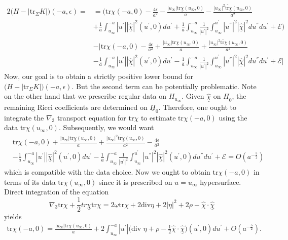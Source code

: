 \documentclass{amsart}
\newcommand{\Hbar}{\underline{H}}
\newcommand{\chihat}{\hat{\chi}}
\newcommand{\chibar}{\underline{\chi}}
\newcommand{\chibarhat}{\underline{\hat{\chi}}}
\renewcommand{\div}{\mbox{div }}
\newcommand{\tr}{\mbox{tr}}
\begin{document}
\begin{align}
2\bigg(H-|\tr_{\Sigma}K|\bigg)(-a,\epsilon)=&=\bigg(\tr\chi(-a,0)-\frac{4\epsilon}{a^{2}}-\frac{|u_{\infty}|\tr\chibar(u_{\infty},0)}{a}-\frac{|u_{\infty}|^{2}\widetilde{\tr\chibar}(u_{\infty},0)}{a^{2}}\\\nonumber
&+\frac{1}{a}\int_{u_{\infty}}^{-a}|u^{'}||\chibarhat|^{2}(u^{'},0)du^{'}+\frac{1}{a}\int_{u_{\infty}}^{-a}\frac{1}{|u^{'}|^{2}}\int_{u_{\infty}}^{u^{'}}|u^{''}|^{2}|\chibarhat|^{2}du^{''}du^{'}+\mathscr{E}\bigg)\\\nonumber
&-\bigg|\tr\chi(-a,0)-\frac{4\epsilon}{a^{2}}+\frac{|u_{\infty}|\tr\chibar(u_{\infty},0)}{a}+\frac{|u_{\infty}|^{2}\widetilde{\tr\chibar}(u_{\infty},0)}{a^{2}}\\\nonumber
&-\frac{1}{a}\int_{u_{\infty}}^{-a}|u^{'}||\chibarhat|^{2}(u^{'},0)du^{'}-\frac{1}{a}\int_{u_{\infty}}^{-a}\frac{1}{|u^{'}|^{2}}\int_{u_{\infty}}^{u^{'}}|u^{''}|^{2}|\chibarhat|^{2}du^{''}du^{'}+\mathscr{E}\bigg|
\end{align}
Now, our goal is to obtain a strictly positive lower bound for $\bigg(H-|\tr_{\Sigma}K|\bigg)(-a,\epsilon)$. But the second term can be potentially problematic. Note on the other hand that we prescribe regular data on $H_{u_{\infty}}$. Given $\chibarhat$ on $\Hbar_{0}$, the remaining Ricci coefficients are determined on $\Hbar_{0}$. Therefore, one ought to integrate the $\nabla_{3}$ transport equation for $\tr\chi$ to estimate $\tr\chi(-a,0)$ using the data $\tr\chi(u_{\infty},0)$.  
Subsequently, we would want 
\begin{align}
\label{eq:trchi}
&\tr\chi(-a,0)+\frac{|u_{\infty}|\tr\chibar(u_{\infty},0)}{a}+\frac{|u_{\infty}|^{2}\widetilde{\tr\chibar}(u_{\infty},0)}{a^{2}}-\frac{4\epsilon}{a^{2}}\\\nonumber
&-\frac{1}{a}\int_{u_{\infty}}^{-a}|u^{'}||\chibarhat|^{2}(u^{'},0)du^{'}-\frac{1}{a}\int_{u_{\infty}}^{-a}\frac{1}{|u^{'}|^{2}}\int_{u_{\infty}}^{u^{'}}|u^{''}|^{2}|\chibarhat|^{2}(u^{'},0)du^{''}du^{'}+\mathscr{E}=O(a^{-\frac{5}{2}})   
\end{align}
which is compatible with the data choice. Now we ought to obtain $\tr\chi(-a,0)$ in terms of its data $\tr\chi(u_{\infty},0)$ since it is prescribed on $u=u_{\infty}$ hypersurface. Direct integration of the equation 
\[
\nabla_{3}\tr\chi+\frac{1}{2}tr\underline{\chi}\tr\chi=2\underline{\omega}\tr\chi+2\text{div}\eta+2|\eta|^{2}+2\rho-\hat{\chi}\cdot \hat{\underline{\chi}}
\]
yields 
\begin{align}
\label{eq:trchi2}
\tr\chi(-a,0)=\frac{|u_{\infty}|\tr\chi(u_{\infty},0)}{a}+2\int_{u_{\infty}}^{-a}|u^{'}|\bigg(\div\eta+\rho-\frac{1}{2}\chihat\cdot\chibarhat\bigg)(u^{'},0)du^{'}+O(a^{-\frac{5}{2}}).
\end{align}
\end{document}
